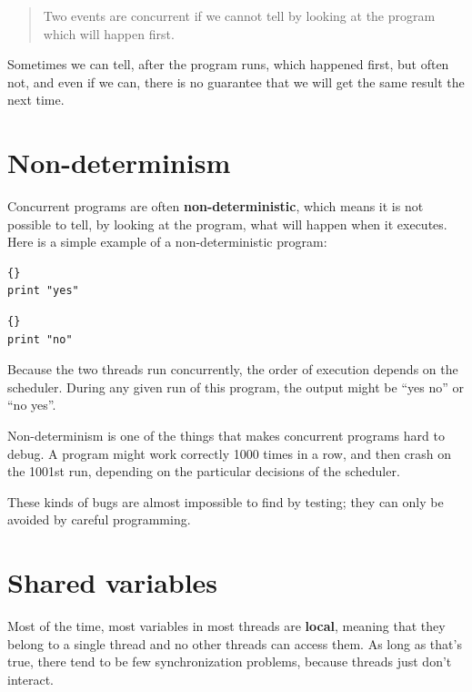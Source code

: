 \documentclass{book}
\begin{document}
\begin{quote}
    Two events are concurrent if we cannot tell by looking at
    the program which will happen first.
\end{quote}

Sometimes we can tell, after the program runs, which happened first,
but often not, and even if we can, there is no guarantee that we will
get the same result the next time.


\section {Non-determinism}

Concurrent programs are often {\bf non-deterministic}, which means it
is not possible to tell, by looking at the program, what will happen
when it executes.  Here is a simple example of a
non-deterministic program:

\noindent\begin{minipage}[t]{0.4\textwidth}
    \begin{lstlisting}[title={Thread A}]{}
print "yes"
\end{lstlisting}
\end{minipage}
\hfill
\noindent\begin{minipage}[t]{0.4\textwidth}
    \begin{lstlisting}[title={Thread B}]{}
print "no"
\end{lstlisting}
\end{minipage}

Because the two threads run concurrently, the order of
execution depends on the scheduler.  During any given run
of this program, the output might be ``yes no'' or ``no yes''.

Non-determinism is one of the things that makes concurrent
programs hard to debug.  A program might work correctly
1000 times in a row, and then crash on the 1001st run, depending
on the particular decisions of the scheduler.

These kinds of bugs are almost impossible to find by testing;
they can only be avoided by careful programming.


\section {Shared variables}
\label{shared}

Most of the time, most variables in most threads are {\bf local},
meaning that they belong to a single thread and no other threads
can access them.  As long as that's true, there tend to be few
synchronization problems, because threads just don't interact.
\end{document}
